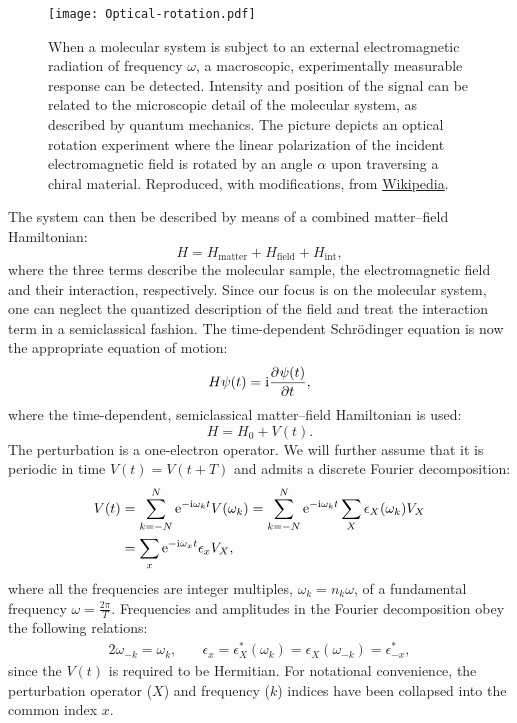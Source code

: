 \begin{figure}[!htb]
  \centering
  \texttt{[image: Optical-rotation.pdf]}
  \caption{
  When a molecular system is subject to an external electromagnetic
  radiation of frequency $\omega$, a macroscopic, experimentally
  measurable response can be detected.
  Intensity and position of the signal can be related to the microscopic
  detail of the molecular system, as described by quantum mechanics.
  The picture depicts an optical rotation experiment where
  the linear polarization of the incident electromagnetic field
  is rotated by an angle $\alpha$ upon traversing a chiral material.
  Reproduced, with modifications, from \href{https://commons.wikimedia.org/wiki/File:Optical-rotation.svg}{Wikipedia}.
  }
  \label{fig:OR}
\end{figure}

The system can then be described by means of a combined matter--field
Hamiltonian:
\begin{equation}
  H = H_\mathrm{matter} + H_\mathrm{field} + H_\mathrm{int},
\end{equation}
where the three terms describe the molecular sample, the electromagnetic
field and their interaction, respectively.
Since our focus is on the molecular system, one can neglect the
quantized description of the field and treat the interaction term in a
semiclassical fashion.\autocite{Craig2012-zp}
The time-dependent Schr\"{o}dinger equation is now the appropriate
equation of motion:
\begin{equation}\label{eq:td-schrodinger}
  H\psi(t) = \mathrm{i}\frac{\partial^{}\psi(t)} {\partial t^{}},
\end{equation}
where the time-dependent, semiclassical matter--field Hamiltonian is
used:
\begin{equation}
  H = H_0 + V(t).
\end{equation}
The perturbation is a one-electron operator. We will further assume that
it is periodic in time $V(t) = V(t+T)$ and admits a discrete Fourier
decomposition:
\begin{equation}\label{eq:fourier}
  \begin{aligned}
 V(t) &=
 \sum_{k=-N}^N \mathrm{e}^{-\mathrm{i}\omega_k t}V(\omega_k)
 =
 \sum_{k=-N}^N\mathrm{e}^{-\mathrm{i}\omega_k t} \sum_X \epsilon_X(\omega_k)V_X \\
 &=
 \sum_{x}\mathrm{e}^{-\mathrm{i}\omega_x t}\epsilon_x V_X,
  \end{aligned}
\end{equation}
where all the frequencies are integer multiples, $\omega_k=n_k \omega$,
of a fundamental frequency $\omega = \frac{2\pi}{T}$.\autocite{Olsen1985-nr}
Frequencies and amplitudes in the Fourier decomposition obey the
following relations:
\begin{alignat}{2}
 \omega_{-k} = \omega_{k},
 \quad&
 \epsilon_x = \epsilon_X^*(\omega_k)
 =
 \epsilon_X(\omega_{-k}) = \epsilon^*_{-x},
\end{alignat}
since the $V(t)$ is required to be Hermitian.
For notational convenience, the perturbation operator ($X$) and
frequency ($k$) indices have been collapsed into the common index $x$.

